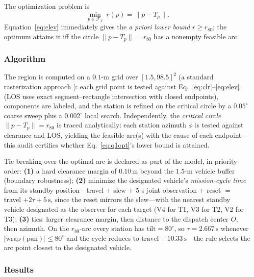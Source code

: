 The optimization problem is
\begin{equation}\label{eq:q1opt}
\min_{p\in\mathcal{F}_{T}}\; r(p)=\|p-T_p\| .
\end{equation}
Equation~\eqref{eq:elev} immediately gives the \emph{a priori lower bound} $r\ge r_{80}$;
the optimum attains it iff the circle $\|p-T_p\|=r_{80}$ has a nonempty feasible arc.

\subsubsection{Algorithm}

The region is computed on a $0.1$-m grid over $[1.5,98.5]^2$ (a standard rasterization
approach \cite{deberg2008}): each grid point is tested against
Eq.~\eqref{eq:clr}--\eqref{eq:elev} (LOS uses exact segment--rectangle intersection with
closed endpoints), components are labeled, and the station is refined on the critical
circle by a $0.05^\circ$ coarse sweep plus a $0.002^\circ$ local search.
Independently, the \emph{critical circle}
$\|p-T_p\|=r_{80}$ is traced analytically: each station azimuth $\phi$ is tested against
clearance and LOS, yielding the feasible arc(s) with the cause of each endpoint---this
audit certifies whether Eq.~\eqref{eq:q1opt}'s lower bound is attained.

Tie-breaking over the optimal arc is declared as part of the model, in priority order:
\textbf{(1)} a hard clearance margin of $0.10\,\mathrm{m}$ beyond the $1.5$-m vehicle
buffer (boundary robustness); \textbf{(2)} minimize the designated vehicle's
\emph{mission-cycle time} from its standby position---travel $+$ slew $+$ 5-s joint
observation $+$ reset $=$ travel $+2\tau+5\,\mathrm{s}$, since the reset mirrors the
slew---with the nearest standby vehicle designated as the observer for each target
(V4 for T1, V3 for T2, V2 for T3); \textbf{(3)} ties: larger clearance margin, then
distance to the dispatch center $O$, then azimuth. On the $r_{80}$-arc every station
has $\mathrm{tilt}=80^\circ$, so $\tau=2.667\,\mathrm{s}$ whenever
$|\mathrm{wrap}(\mathrm{pan})|\le80^\circ$ and the cycle reduces to
$\mathrm{travel}+10.33\,\mathrm{s}$---the rule selects the arc point closest to the
designated vehicle.

\subsubsection{Results}

